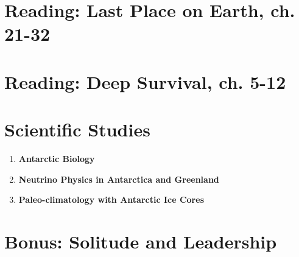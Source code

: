 \documentclass[10pt]{article}
\begin{document}
\maketitle

\section{Reading: Last Place on Earth, ch. 21-32}

\section{Reading: Deep Survival, ch. 5-12}

\section{Scientific Studies}

\begin{enumerate}
\item \textbf{Antarctic Biology}
\item \textbf{Neutrino Physics in Antarctica and Greenland}
\item \textbf{Paleo-climatology with Antarctic Ice Cores}
\end{enumerate}

\section{Bonus: Solitude and Leadership}
\end{document}
